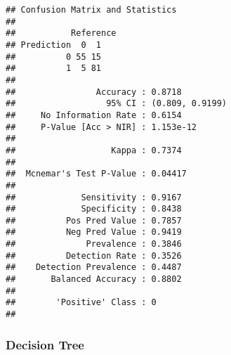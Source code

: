 \documentclass[
]{article}
\newenvironment{Shaded}{\begin{snugshade}}{\end{snugshade}}
\newcommand{\AttributeTok}[1]{\textcolor[rgb]{0.77,0.63,0.00}{#1}}
\newcommand{\FunctionTok}[1]{\textcolor[rgb]{0.00,0.00,0.00}{#1}}
\newcommand{\NormalTok}[1]{#1}
\newcommand{\OtherTok}[1]{\textcolor[rgb]{0.56,0.35,0.01}{#1}}
\newcommand{\SpecialCharTok}[1]{\textcolor[rgb]{0.00,0.00,0.00}{#1}}
\newcommand{\StringTok}[1]{\textcolor[rgb]{0.31,0.60,0.02}{#1}}
\begin{document}
\begin{verbatim}
## Confusion Matrix and Statistics
## 
##           Reference
## Prediction  0  1
##          0 55 15
##          1  5 81
##                                          
##                Accuracy : 0.8718         
##                  95% CI : (0.809, 0.9199)
##     No Information Rate : 0.6154         
##     P-Value [Acc > NIR] : 1.153e-12      
##                                          
##                   Kappa : 0.7374         
##                                          
##  Mcnemar's Test P-Value : 0.04417        
##                                          
##             Sensitivity : 0.9167         
##             Specificity : 0.8438         
##          Pos Pred Value : 0.7857         
##          Neg Pred Value : 0.9419         
##              Prevalence : 0.3846         
##          Detection Rate : 0.3526         
##    Detection Prevalence : 0.4487         
##       Balanced Accuracy : 0.8802         
##                                          
##        'Positive' Class : 0              
## 
\end{verbatim}

\hypertarget{decision-tree}{%
\subsubsection{Decision Tree}\label{decision-tree}}

\begin{Shaded}
\end{Shaded}
\end{document}
